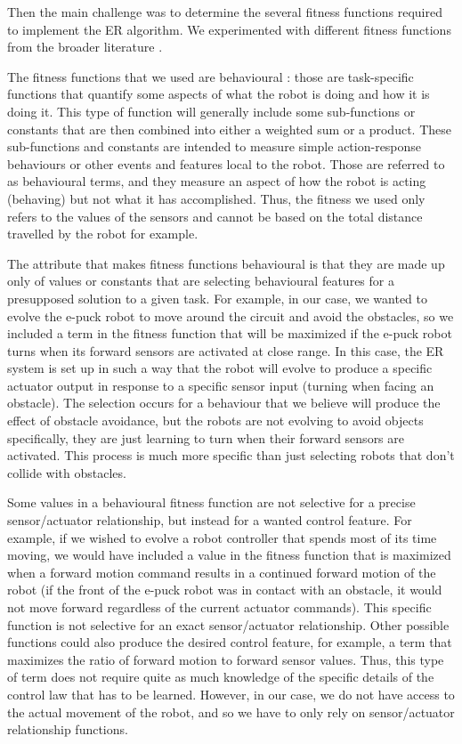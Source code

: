 \documentclass[lettersize,journal]{IEEEtran}
\begin{document}
\par
Then the main challenge was to determine the several fitness functions required to implement the ER algorithm. We experimented with different fitness functions from the broader literature \cite{ref1} \cite{ref2}.
\par
The fitness functions that we used are behavioural \cite{ref4}: those are task-specific functions that quantify some aspects of what the robot is doing and how it is doing it. This type of function will generally include some sub-functions or constants that are then combined into either a weighted sum or a product. These sub-functions and constants are intended to measure simple action-response behaviours or other events and features local to the robot. Those are referred to as behavioural terms, and they measure an aspect of how the robot is acting (behaving) but not what it has accomplished. Thus, the fitness we used only refers to the values of the sensors and cannot be based on the total distance travelled by the robot for example.
\par
The attribute that makes fitness functions behavioural is that they are made up only of values or constants that are selecting behavioural features for a presupposed solution to a given task. For example, in our case, we wanted to evolve the e-puck robot to move around the circuit and avoid the obstacles, so we included a term in the fitness function that will be maximized if the e-puck robot turns when its forward sensors are activated at close range. In this case, the ER system is set up in such a way that the robot will evolve to produce a specific actuator output in response to a specific sensor input (turning when facing an obstacle). The selection occurs for a behaviour that we believe will produce the effect of obstacle avoidance, but the robots are not evolving to avoid objects specifically, they are just learning to turn when their forward sensors are activated. This process is much more specific than just selecting robots that don't collide with obstacles.
\par
Some values in a behavioural fitness function are not selective for a precise sensor/actuator relationship, but instead for a wanted control feature. For example, if we wished to evolve a robot controller that spends most of its time moving, we would have included a value in the fitness function that is maximized when a forward motion command results in a continued forward motion of the robot (if the front of the e-puck robot was in contact with an obstacle, it would not move forward regardless of the current actuator commands). This specific function is not selective for an exact sensor/actuator relationship. Other possible functions could also produce the desired control feature, for example, a term that maximizes the ratio of forward motion to forward sensor values. Thus, this type of term does not require quite as much knowledge of the specific details of the control law that has to be learned. However, in our case, we do not have access to the actual movement of the robot, and so we have to only rely on sensor/actuator relationship functions. 
\end{document}
